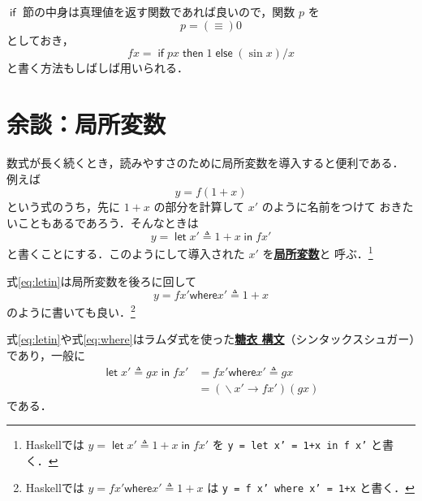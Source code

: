 \documentclass[a5paper,twoside,fleqn]{jsbook}
\newcommand{\programminglanguage}[1]{\textsf{#1}}
\newcommand{\haskell}{\programminglanguage{Haskell}}
\newcommand{\keyword}[1]{{\underline{\textbf{#1}}}}
\newcommand{\code}[1]{\texttt{#1}}
\newcommand{\mKeyword}[1]{\mathsf{#1}} %
\newcommand{\mIfKeyword}{\mKeyword{if}}
\newcommand{\mElseKeyword}{\mKeyword{else}}
\newcommand{\mInKeyword}{\mKeyword{in}}
\newcommand{\mLetKeyword}{\mKeyword{let}}
\newcommand{\mOtherwiseKeyword}{\mKeyword{otherwise}}
\newcommand{\mThenKeyword}{\mKeyword{then}}
\newcommand{\mWhereKeyword}{\mKeyword{where}}
\DeclareMathOperator{\mElse}{\mElseKeyword}
\DeclareMathOperator{\mIf}{\mIfKeyword}
\DeclareMathOperator{\mInKW}{\mInKeyword} %
\DeclareMathOperator{\mLetKW}{\mLetKeyword} %
\DeclareMathOperator{\mOtherwise}{\mOtherwiseKeyword}
\DeclareMathOperator{\mThen}{\mThenKeyword}
\DeclareMathOperator{\mLambda}{\backslash}
\DeclareMathOperator{\mLambdaArrow}{\rightarrow}
\DeclareMathOperator{\mLetEq}{\triangleq}
\newcommand{\mIfThenElse}[3]{\mIf{#1}\mThen{#2}\mElse{#3}}
\newcommand{\mLambdaExp}[2]{\mLambda{#1}\mLambdaArrow{#2}}
\newcommand{\mLetIn}[3]{\mLetKW#1\mLetEq#2\mInKW{#3}}
\newcommand{\mWhereIs}[2]{\mathbin{\mWhereKeyword}#1\mLetEq#2}
\begin{document}
$\mIf$ 節の中身は真理値を返す関数であれば良いので，関数 $p$ を
\begin{equation}
p=(\equiv)0
\end{equation}
としておき，
\begin{equation}
fx=\mIfThenElse{px}{1}{{}(\sin x)/x}
\end{equation}
と書く方法もしばしば用いられる．


\section{余談：局所変数}

数式が長く続くとき，読みやすさのために局所変数を導入すると便利である．
例えば
\begin{equation}
y=f(1+x)
\end{equation}
という式のうち，先に $1+x$ の部分を計算して $x'$ のように名前をつけて
おきたいこともあるであろう．そんなときは
\begin{equation}
\label{eq:letin}
y=\mLetIn{x'}{1+x}{fx'}
\end{equation}
と書くことにする．このようにして導入された $x'$ を\keyword{局所変数}と
呼ぶ．\footnote{\haskell では $y=\mLetIn{x'}{1+x}{fx'}$ を \code{y =
    let x' = 1+x in f x'} と書く．}

式\eqref{eq:letin}は局所変数を後ろに回して
\begin{equation}
\label{eq:where}
y=fx'\mWhereIs{x'}{1+x}
\end{equation}
のように書いても良い．\footnote{\haskell では
  $y=fx'\mWhereIs{x'}{1+x}$ は \code{y = f x' where x' = 1+x} と書く．}

式\eqref{eq:letin}や式\eqref{eq:where}はラムダ式を使った\keyword{糖衣
  構文}（シンタックスシュガー）であり，一般に
\begin{align}
\mLetIn{x'}{gx}{fx'}
&=fx'\mWhereIs{x'}{gx}\\ &=(\mLambdaExp{x'}{fx'})(gx)
\end{align}
である．
\end{document}

